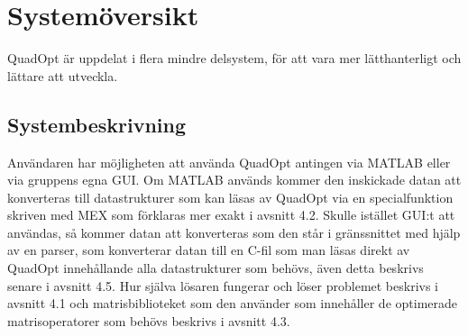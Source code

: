 \newpage
\section{Systemöversikt}
QuadOpt är uppdelat i flera mindre delsystem, för att vara mer lätthanterligt och lättare att utveckla.

\subsection{Systembeskrivning}


Användaren har möjligheten att använda QuadOpt antingen via MATLAB eller via gruppens egna GUI. Om MATLAB används kommer den inskickade datan att konverteras till datastrukturer som kan läsas av QuadOpt via en specialfunktion skriven med MEX som förklaras mer exakt i avsnitt 4.2. Skulle istället GUI:t att användas, så kommer datan att konverteras som den står i gränssnittet med hjälp av en parser, som konverterar datan till en C-fil som man läsas direkt av QuadOpt innehållande alla datastrukturer som behövs, även detta beskrivs senare i avsnitt 4.5. Hur själva lösaren fungerar och löser problemet beskrivs i avsnitt 4.1 och matrisbiblioteket som den använder som innehåller de optimerade matrisoperatorer som behövs beskrivs i avsnitt 4.3.

